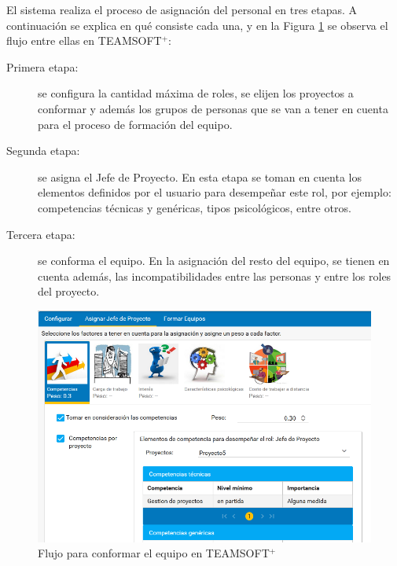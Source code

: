 El sistema realiza el proceso de asignación del personal en tres etapas. A continuación se explica en qué consiste cada una, y en la Figura \ref{fig:conf_equip_teamsoft} se observa el flujo entre ellas en TEAMSOFT$^+$:
\begin{description}
	\item[Primera etapa:] se configura la cantidad máxima de roles, se elijen los proyectos a conformar y además los grupos de personas que se van a tener en cuenta para el proceso de formación del equipo.
	\item[Segunda etapa:] se asigna el Jefe de Proyecto. En esta etapa se toman en cuenta los elementos definidos por el usuario para desempeñar este rol, por ejemplo: competencias técnicas y genéricas, tipos psicológicos, entre otros.
	\item[Tercera etapa:] se conforma el equipo. En la asignación del resto del equipo, se tienen en cuenta además, las incompatibilidades entre las personas y entre los roles del proyecto.
\end{description}


\begin{figure}[H]
	\centering
	\includegraphics[width=1\textwidth]{figuras/conformacion_equipos_asignar_jefe.png}
	\caption{Flujo para conformar el equipo en TEAMSOFT$^+$}\label{fig:conf_equip_teamsoft}
\end{figure}


